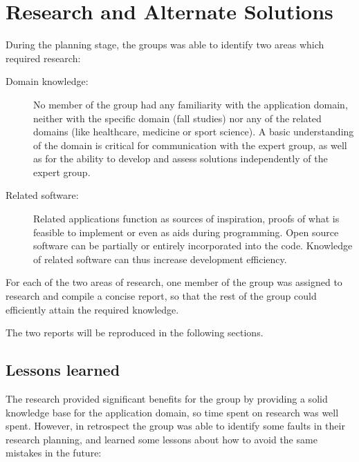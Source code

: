 \chapter{Research and Alternate Solutions}
During the planning stage, the groups was able to identify two areas which required research:
\begin{description}
\item[Domain knowledge:] No member of the group had any familiarity with the application domain, neither with the specific domain (fall studies) nor any of the related domains (like healthcare, medicine or sport science). A basic understanding of the domain is critical for communication with the expert group, as well as for the ability to develop and assess solutions independently of the expert group.
\item[Related software:] Related applications function as sources of inspiration, proofs of what is feasible to implement or even as aids during programming. Open source software can be partially or entirely incorporated into the code. Knowledge of related software can thus increase development efficiency.  
\end{description}
For each of the two areas of research, one member of the group was assigned to research and compile a concise report, so that the rest of the group could efficiently attain the required knowledge.   

The two reports will be reproduced in the following sections.





\section{Lessons learned}
The research provided significant benefits for the group by providing a solid knowledge base for the application domain, so time spent on research was well spent. However, in retrospect the group was able to identify some faults in their research planning, and learned some lessons about how to avoid the same mistakes in the future:

